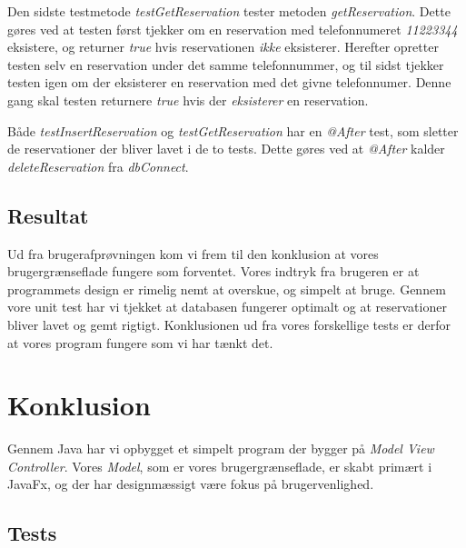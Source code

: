 \documentclass[final]{report}
\begin{document}
Den sidste testmetode \emph{testGetReservation} tester metoden \emph{getReservation}. Dette gøres ved at testen først tjekker om en reservation med telefonnumeret \emph{11223344} eksistere, og returner \emph{true} hvis reservationen \emph{ikke} eksisterer. Herefter opretter testen selv en reservation under det samme telefonnummer, og til sidst tjekker testen igen om der eksisterer en reservation med det givne telefonnumer. Denne gang skal testen returnere \emph{true} hvis der \emph{eksisterer} en reservation. 

Både \emph{testInsertReservation} og \emph{testGetReservation} har en \emph{@After} test, som sletter de reservationer der bliver lavet i de to tests. Dette gøres ved at \emph{@After} kalder \emph{deleteReservation} fra \emph{dbConnect}.


\section{Resultat}
Ud fra brugerafprøvningen kom vi frem til den konklusion at vores brugergrænseflade fungere som forventet. Vores indtryk fra brugeren er at programmets design er rimelig nemt at overskue, og simpelt at bruge. Gennem vore unit test har vi tjekket at databasen fungerer optimalt og at reservationer bliver lavet og gemt rigtigt. Konklusionen ud fra vores forskellige tests er derfor at vores program fungere som vi har tænkt det. 

\chapter{Konklusion}
Gennem Java har vi opbygget et simpelt program der bygger på \emph{Model View Controller}. Vores \emph{Model}, som er vores brugergrænseflade, er skabt primært i JavaFx, og der har designmæssigt \cite{oracle} være fokus på \cite{Java} brugervenlighed\cite{video}. 

\printbibliography

\listoffigures

\begin{appendix}

\chapter{Tests}
\inputminted{java}{../src/test/DBConnectTest.java}

\end{appendix}
\end{document}
